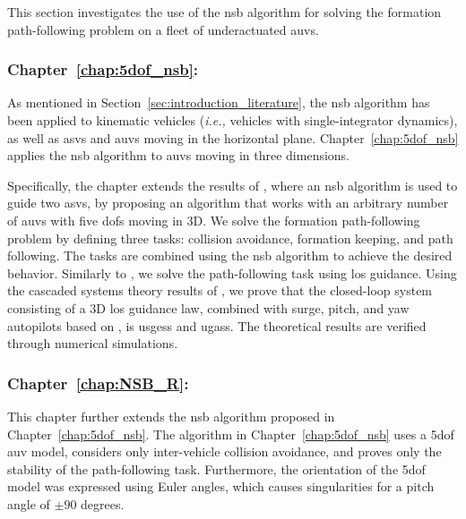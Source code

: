 This section investigates the use of the \acrlong{nsb} algorithm for solving the formation path-following problem on a fleet of underactuated \glspl{auv}.

\subsubsection{Chapter~\ref{chap:5dof_nsb}: }

As mentioned in Section~\ref{sec:introduction_literature}, the \gls{nsb} algorithm has been applied to kinematic vehicles (\emph{i.e.,} vehicles with single-integrator dynamics), as well as \glspl{asv} and \glspl{auv} moving in the horizontal plane.
Chapter~\ref{chap:5dof_nsb} applies the \gls{nsb} algorithm to \glspl{auv} moving in three dimensions.

Specifically, the chapter extends the results of \cite{eek_formation_2021}, where an \gls{nsb} algorithm is used to guide two \glspl{asv}, by proposing an algorithm that works with an arbitrary number of \glspl{auv} with five \glspl{dof} moving in 3D.
We solve the formation path-following problem by defining three tasks: collision avoidance, formation keeping, and path following.
The tasks are combined using the \gls{nsb} algorithm to achieve the desired behavior.
Similarly to \cite{eek_formation_2021}, we solve the path-following task using \gls{los} guidance.
Using the cascaded systems theory results of \cite{pettersen_lyapunov_2017}, we prove that the closed-loop system consisting of a 3D \gls{los} guidance law, combined with surge, pitch, and yaw autopilots based on \cite{moe_LOS_2016}, is \glspl{usges} and \glspl{ugas}.
The theoretical results are verified through numerical simulations.

\subsubsection{Chapter~\ref{chap:NSB_R}: }

This chapter further extends the \gls{nsb} algorithm proposed in Chapter~\ref{chap:5dof_nsb}.
The algorithm in Chapter~\ref{chap:5dof_nsb} uses a 5\gls{dof} \gls{auv} model, considers only inter-vehicle collision avoidance, and proves only the stability of the path-following task.
Furthermore, the orientation of the 5\gls{dof} model was expressed using Euler angles, which causes singularities for a pitch angle of $\pm90$ degrees.

